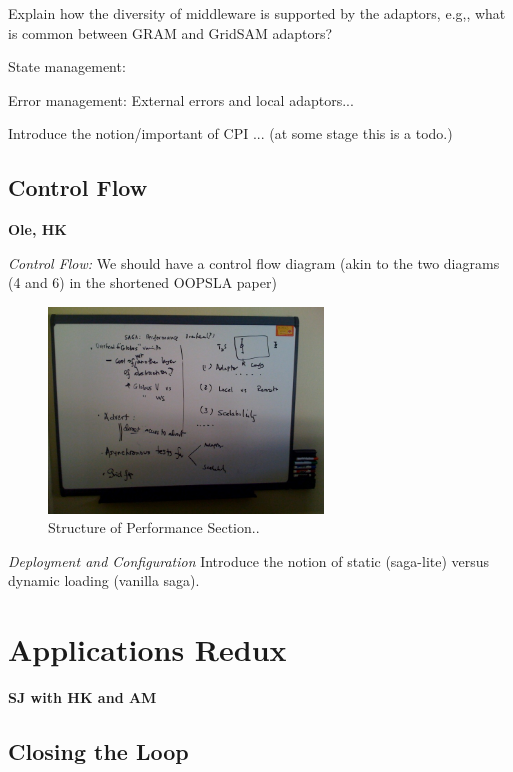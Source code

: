 \documentclass[10pt,letterpaper]{article}
\newcommand{\up}{\vspace*{-0.25em}}
\begin{document}
Explain how the diversity of middleware is supported by the adaptors,
e.g,, what is common between GRAM and GridSAM adaptors?

State management:

Error management: External errors and local adaptors...

Introduce the notion/important of CPI ... (at some stage this is a
todo.)

\subsection{Control Flow}{\bf Ole, HK}

{\it Control Flow:} We should have a control flow diagram (akin to the two diagrams (4 and 6) in the shortened OOPSLA paper)

\begin{figure}[!ht]
  \up\up
  \begin{center}
      \includegraphics[width=0.65\textwidth]{../figures/ole_board-01.jpg}
 \end{center}
  \up\up\up\up\up\up\up\up\up\up
  \caption{\small Structure of Performance Section..}
 \label{stuff..}
\end{figure}


{\it Deployment and Configuration} Introduce the notion of static
(saga-lite) versus dynamic loading (vanilla saga).



\section{Applications Redux}{\bf SJ with HK and AM}

\subsection{Closing the Loop}
\end{document}
